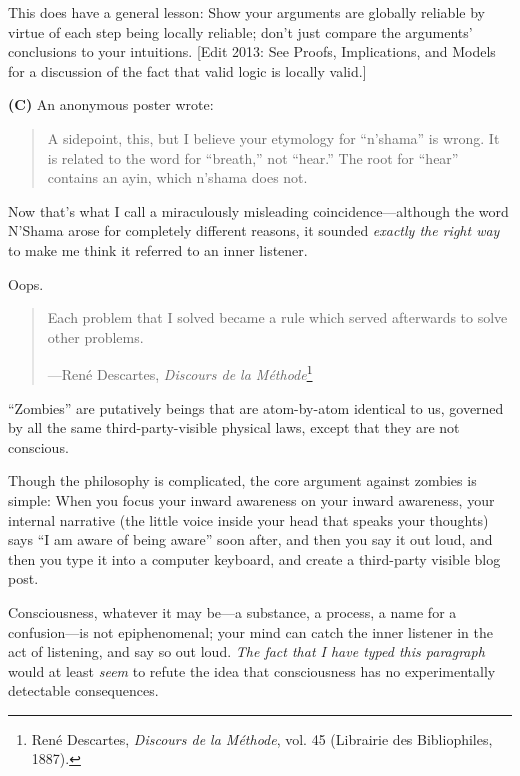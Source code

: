 {
 This does have a general lesson: Show your arguments are globally
reliable by virtue of each step being locally reliable;
don't just compare the arguments'
conclusions to your intuitions. [Edit 2013: See Proofs, Implications,
and Models for a discussion of the fact that valid logic is locally
valid.]}

{
 \textbf{(C)} An anonymous poster wrote:}

\begin{quotation}

{
 A sidepoint, this, but I believe your etymology for
``n'shama'' is
wrong. It is related to the word for
``breath,'' not
``hear.'' The root for
``hear'' contains an ayin, which
n'shama does not.}
\end{quotation}

{
 Now that's what I call a miraculously misleading
coincidence---although the word N'Shama arose for
completely different reasons, it sounded \textit{exactly the right way}
to make me think it referred to an inner listener.}

{
 Oops.}

\myendsectiontext


\begin{quote}
{
 Each problem that I solved became a rule which served afterwards
to solve other problems.}

{\raggedleft
 {}---René Descartes, \textit{Discours de la
Méthode}\footnote{René Descartes, \textit{Discours de la Méthode}, vol. 45
(Librairie des Bibliophiles, 1887).}
\par}
\end{quote}


{
 ``Zombies'' are putatively
beings that are atom-by-atom identical to us, governed by all the same
third-party-visible physical laws, except that they are not conscious.}

{
 Though the philosophy is complicated, the core argument against
zombies is simple: When you focus your inward awareness on your inward
awareness, your internal narrative (the little voice inside your head
that speaks your thoughts) says ``I am aware of being
aware'' soon after, and then you say it out loud, and
then you type it into a computer keyboard, and create a third-party
visible blog post.}

{
 Consciousness, whatever it may be---a substance, a process, a name
for a confusion---is not epiphenomenal; your mind can catch the inner
listener in the act of listening, and say so out loud. \textit{The fact
that I have typed this paragraph} would at least \textit{seem} to
refute the idea that consciousness has no experimentally detectable
consequences.}

